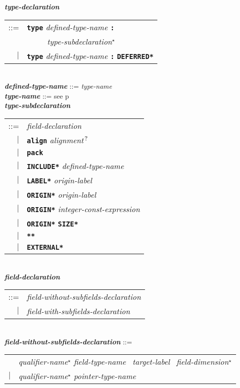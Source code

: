 \documentclass[12pt]{article}
\newcommand{\TT}[1]{{\tt \bfseries #1}}
\newcommand{\STAR}{{\Large $^\star$}}
\newcommand{\QMARK}{{$^{\,\mbox{\footnotesize ?}}$}}
\newcommand{\ttkey}[1]{{\tt \bfseries #1}}
\newcommand{\emkey}[1]{{\em \bfseries #1}}
\newcommand{\pagref}[1]{p\pageref{#1}}
\newenvironment{indpar}[1][0.3in]%
	{\begin{list}{}%
		     {\setlength{\itemsep}{0in}%
		      \setlength{\topsep}{0in}%
		      \setlength{\parsep}{1ex}%
		      \setlength{\labelwidth}{#1}%
		      \setlength{\leftmargin}{#1}%
		      \addtolength{\leftmargin}{\labelsep}}%
	 \item}%
	{\end{list}}
\begin{document}
\begin{indpar}
\emkey{type-declaration}\label{TYPE-DECLARATION}
    \begin{tabular}[t]{rl}
    ::= & \ttkey{type} {\em defined-type-name} \TT{:} \\
	& \TT{~~~~~}{\em type-subdeclaration}\STAR{} \\
    $|$ & \ttkey{type} {\em defined-type-name} \TT{:} \ttkey{*DEFERRED*} \\
    \end{tabular} \\
\emkey{defined-type-name} ::= {\em type-name} \\
\emkey{type-name} ::= see \pagref{TYPE-NAME}
\\[2ex]
\emkey{type-subdeclaration}
    \begin{tabular}[t]{@{}rl}
    ::= &  {\em field-declaration} \\
    $|$ &  \ttkey{align} {\em alignment}\QMARK{} \\
    $|$ &  \ttkey{pack} \\
    $|$ &  \ttkey{*INCLUDE*} {\em defined-type-name} \\
    $|$ &  \ttkey{*LABEL*} {\em origin-label} \\
    $|$ &  \ttkey{*ORIGIN*} {\em origin-label} \\
    $|$ &  \ttkey{*ORIGIN*} {\em integer-const-expression} \\
    $|$ &  \ttkey{*ORIGIN*} \ttkey{*SIZE*} \\
    $|$ &  \ttkey{***} \\
    $|$ &  \ttkey{*EXTERNAL*} \\
    \end{tabular}
\\[2ex]
\emkey{field-declaration}
    \begin{tabular}[t]{@{}rl}
    ::= &  {\em field-without-subfields-declaration} \\
    $|$ &  {\em field-with-subfields-declaration} \\
    \end{tabular}
\\[2ex]
\emkey{field-without-subfields-declaration} ::= \\
\hspace*{0.5in}\begin{tabular}{rl}
        & {\em qualifier-name}\STAR{} {\em field-type-name}~
          {\em target-label}~ {\em field-dimension}\STAR{} \\
    $|$ & {\em qualifier-name}\STAR{} {\em pointer-type-name} \\

\end{tabular}
\end{indpar}
\end{document}
